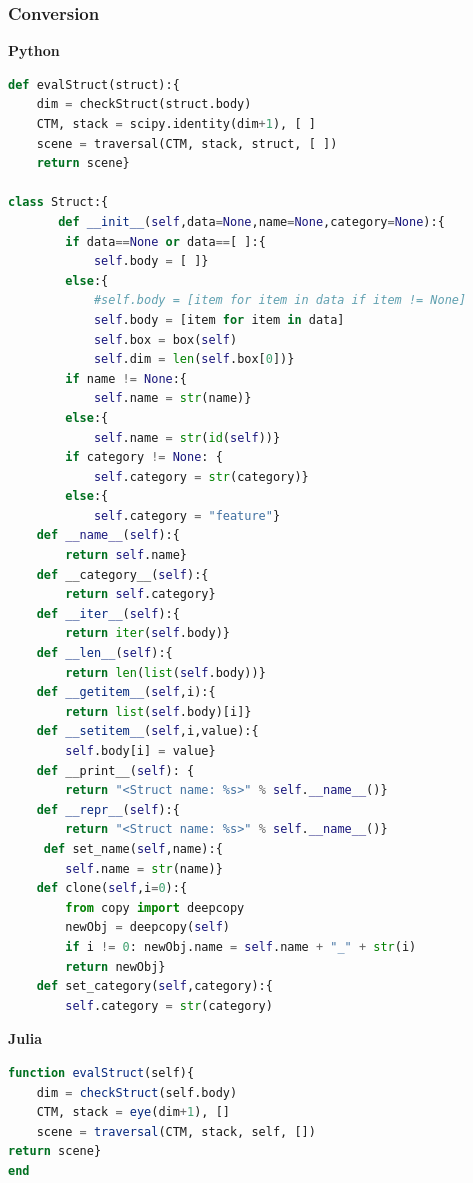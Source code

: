 \documentclass[a4paper,12pt]{article}
\begin{document}
\subsubsection{Conversion}
\textbf{Python}
\begin{lstlisting}[language=Python,format=Julia]
def evalStruct(struct):{
    dim = checkStruct(struct.body)
    CTM, stack = scipy.identity(dim+1), [ ]
    scene = traversal(CTM, stack, struct, [ ]) 
    return scene}

class Struct:{
       def __init__(self,data=None,name=None,category=None):{
        if data==None or data==[ ]:{
            self.body = [ ]}
        else:{
            #self.body = [item for item in data if item != None]
            self.body = [item for item in data]
            self.box = box(self) 
            self.dim = len(self.box[0])}
        if name != None:{ 
            self.name = str(name)}
        else:{
            self.name = str(id(self))}
        if category != None: {
            self.category = str(category)}
        else:{
            self.category = "feature"}
    def __name__(self):{
        return self.name}
    def __category__(self):{
        return self.category}
    def __iter__(self):{
        return iter(self.body)}
    def __len__(self):{
        return len(list(self.body))}
    def __getitem__(self,i):{
        return list(self.body)[i]}
    def __setitem__(self,i,value):{
        self.body[i] = value}
    def __print__(self): {
        return "<Struct name: %s>" % self.__name__()}
    def __repr__(self):{
        return "<Struct name: %s>" % self.__name__()}
     def set_name(self,name):{
        self.name = str(name)}
    def clone(self,i=0):{
        from copy import deepcopy
        newObj = deepcopy(self)
        if i != 0: newObj.name = self.name + "_" + str(i)
        return newObj}
    def set_category(self,category):{
        self.category = str(category)
\end{lstlisting}
\textbf{Julia}
\begin{lstlisting}[language=Julia,format=Julia]
function evalStruct(self){
	dim = checkStruct(self.body)
   	CTM, stack = eye(dim+1), []
   	scene = traversal(CTM, stack, self, []) 
return scene}
end

\end{lstlisting}
\end{document}
